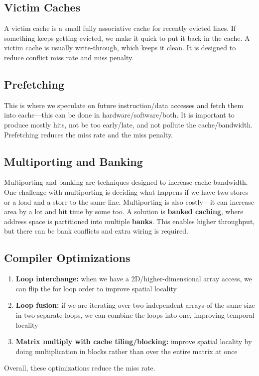\documentclass{article}
\begin{document}
\subsection{Victim Caches}

A victim cache is a small fully associative cache for recently evicted lines. If something keeps getting evicted, we make it quick to put it back in the cache. A victim cache is usually write-through, which keeps it clean. It is designed to reduce conflict miss rate and miss penalty.

\subsection{Prefetching}

This is where we speculate on future instruction/data accesses and fetch them into cache---this can be done in hardware/software/both. It is important to produce mostly hits, not be too early/late, and not pollute the cache/bandwidth. Prefetching reduces the miss rate and the miss penalty.

\subsection{Multiporting and Banking}

Multiporting and banking are techniques designed to increase cache bandwidth. One challenge with multiporting is deciding what happens if we have two stores or a load and a store to the same line. Multiporting is also costly---it can increase area by a lot and hit time by some too. A solution is \textbf{banked caching}, where address space is partitioned into multiple \textbf{banks}. This enables higher throughput, but there can be bank conflicts and extra wiring is required.

\subsection{Compiler Optimizations}

\begin{enumerate}
\item \textbf{Loop interchange:} when we have a 2D/higher-dimensional array access, we can flip the for loop order to improve spatial locality
\item \textbf{Loop fusion:} if we are iterating over two independent arrays of the same size in two separate loops, we can combine the loops into one, improving temporal locality
\item \textbf{Matrix multiply with cache tiling/blocking:} improve spatial locality by doing multiplication in blocks rather than over the entire matrix at once
\end{enumerate}
Overall, these optimizations reduce the miss rate.
\end{document}
